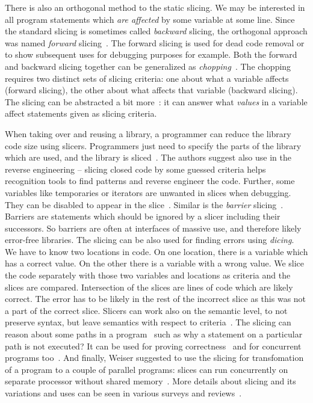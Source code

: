 There is also an orthogonal method to the static slicing. We may be
interested in all program statements which \emph{are affected} by some
variable at some line. Since the standard slicing is sometimes called
\emph{backward} slicing, the orthogonal approach was named \emph{forward}
slicing~\cite{slic_forw}. The forward slicing is used for dead code removal
or to show subsequent uses for debugging purposes for example. Both the
forward and backward slicing together can be generalized as
\emph{chopping}~\cite{slic_chopping}. The chopping requires two distinct sets
of slicing criteria: one about what a variable affects (forward slicing), the
other about what affects that variable (backward slicing). The slicing can be
abstracted a bit more~\cite{slic_abstract}: it can answer what \emph{values}
in a variable affect statements given as slicing criteria.

When taking over and reusing a library, a programmer can reduce the library
code size using slicers. Programmers just need to specify the parts of the
library which are used, and the library is sliced~\cite{slic_interface}.
The authors suggest also use in the reverse engineering -- slicing closed code
by some guessed criteria helps recognition tools to find patterns and reverse
engineer the code. Further, some variables like temporaries or iterators are
unwanted in slices when debugging. They can be disabled to appear in the
slice~\cite{slic_stop}. Similar is the \emph{barrier}
slicing~\cite{slic_barrier}. Barriers are statements which should be ignored
by a slicer including their successors.  So barriers are often at interfaces
of massive use, and therefore likely error-free libraries.  The slicing can
be also used for finding errors using \emph{dicing}. We have to know two
locations in code. On one location, there is a variable which has a correct
value. On the other there is a variable with a wrong value. We slice the code
separately with those two variables and locations as criteria and the slices
are compared. Intersection of the slices are lines of code which are likely
correct. The error has to be likely in the rest of the incorrect slice as this
was not a part of the correct slice. Slicers can work also on the semantic
level, to not preserve syntax, but leave semantics with respect to
criteria~\cite{slic_amorphous}. The slicing can reason about some paths in a
program~\cite{slic_path} such as why a statement on a particular path is not
executed? It can be used for proving correctness~\cite{slic_mc} and for
concurrent programs too~\cite{slic_concur}.  And finally, Weiser suggested to
use the slicing for transfomation of a program to a couple of parallel
programs: slices can run concurrently on separate processor without shared
memory~\cite{slicing}.  More details about slicing and its variations and uses
can be seen in various surveys and reviews~\cite{slic_overview95,
slic_overview96, slic_overview98, slic_overview01a, slic_overview01b,
slic_overview05, slic_overview12}.

